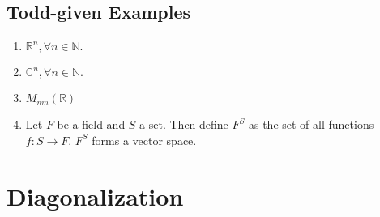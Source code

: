 \documentclass[a4paper,10pt]{article}
\begin{document}
\subsection{Todd-given Examples}
\begin{enumerate}
	\item $\mathbb{R}^n, \forall n \in \mathbb{N}.$ 
	\item $\mathbb{C}^n, \forall n \in \mathbb{N}.$ 
	\item $M_{nm}(\mathbb{R})$
	\item Let $F$ be a field and $S$ a set. Then define $F^S$ as the set of all functions $f: S \rightarrow F$. $F^S$ forms a vector space.
\end{enumerate}







\section{Diagonalization}
\end{document}
